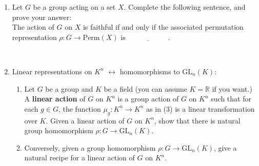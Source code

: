 \documentclass[12pt]{amsart}
\newcommand\itemB{\stepcounter{enumi}\item[(\theenumi)]}
\begin{document}
\begin{enumerate}
\

\itemB Let $G$ be a group acting on a set $X$. Complete the following sentence, and prove your answer: \\
The action of $G$ on $X$ is faithful if and only if the associated permutation representation ${\rho: G\to \mathrm{Perm}(X)}$ is $\underline{\phantom{INJECTIVE}}$.

\

\itemB Linear representations on $K^n$ $\longleftrightarrow$ homomorphisms to $\mathrm{GL}_n(K)$:
\begin{enumerate}
\item Let $G$ be a group and $K$ be a field (you can assume $K=\mathbb{R}$ if you want.) A \textbf{linear action} of $G$ on $K^n$ is a group action of $G$ on $K^n$ such that for each $g\in G$, the function $\mu_g: K^n \to K^n$ as in (3) is a linear transformation over $K$. Given a linear action of $G$ on $K^n$, show that there is natural group homomorphism $\rho: G\to \mathrm{GL}_n(K)$. 
\item Conversely, given a group homomorphism $\rho: G \to \mathrm{GL}_n(K)$, give a natural recipe for a linear action of $G$ on $K^n$.
\end{enumerate}
\end{enumerate}
\end{document}
